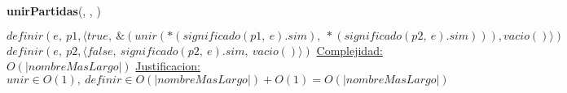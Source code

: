 \begin{Algoritmos}
    \begin{algorithm}[H]{\textbf{unirPartidas}(, , )}
        \begin{algorithmic}[1]
            \State $definir(e,\ p1, \langle true,\ \&(unir(*(significado(p1,\ e).sim),\ *(significado(p2,\ e).sim))), vacio()\rangle)$
            \State $definir(e,\ p2, \langle false,\ significado(p2,\ e).sim,\ vacio() \rangle)$
            \medskip
            \Statex \underline{Complejidad:} $O(|nombreMasLargo|)$
            \Statex \underline{Justificacion:} $unir \in O(1),\ definir \in O(|nombreMasLargo|) + O(1) = O(|nombreMasLargo|)$
        \end{algorithmic}
    \end{algorithm}    




\end{Algoritmos}
